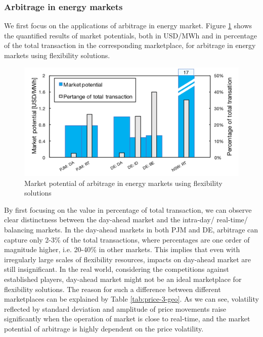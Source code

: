 \subsubsection{Arbitrage in energy markets}

We first focus on the applications of arbitrage in energy market. Figure \ref{fig:Potential-Arbitrage} shows the quantified results of market potentials, both in USD/MWh and in percentage of the total transaction in the corresponding marketplace, for arbitrage in energy markets using flexibility solutions. 
	
\begin{figure}[h!]
	\centering
	\includegraphics[width=0.95\linewidth]{Figures/Potential-Arbitrage}
	\caption{Market potential of arbitrage in energy markets using flexibility solutions}
	\label{fig:Potential-Arbitrage}
\end{figure}

By first focusing on the value in percentage of total transaction, we can observe clear distinctness between the day-ahead market  and the intra-day/ real-time/ balancing markets. In the day-ahead markets in both PJM and DE, arbitrage can capture only 2-3\% of the total transactions, where percentages are one order of magnitude higher, i.e. 20-40\% in other markets. This implies that even with irregularly large scales of flexibility resources, impacts on day-ahead market are still insignificant. In the real world, considering the competitions against established players, day-ahead market might not be an ideal marketplace for flexibility solutions. The reason for such a difference between different marketplaces can be explained by Table \ref{tab:price-3-geo}. %
As we can see, volatility reflected by standard deviation and amplitude of price movements raise significantly when the operation of market is close to real-time, and the market potential of arbitrage is highly dependent on the price volatility.

